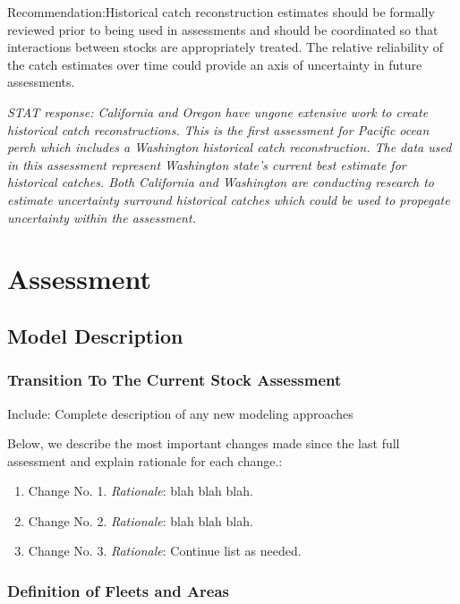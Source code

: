 \documentclass[12pt,]{article}
\begin{document}
Recommendation:Historical catch reconstruction estimates should be
formally reviewed prior to being used in assessments and should be
coordinated so that interactions between stocks are appropriately
treated. The relative reliability of the catch estimates over time could
provide an axis of uncertainty in future assessments.

\emph{STAT response: California and Oregon have ungone extensive work to
create historical catch reconstructions. This is the first assessment
for Pacific ocean perch which includes a Washington historical catch
reconstruction. The data used in this assessment represent Washington
state's current best estimate for historical catches. Both California
and Washington are conducting research to estimate uncertainty surround
historical catches which could be used to propegate uncertainty within
the assessment.}

\section{Assessment}\label{assessment}

\subsection{Model Description}\label{model-description}

\subsubsection{Transition To The Current Stock
Assessment}\label{transition-to-the-current-stock-assessment}

Include: Complete description of any new modeling approaches

Below, we describe the most important changes made since the last full
assessment and explain rationale for each change.:

\begin{enumerate}
\def\labelenumi{\arabic{enumi}.}
\item
  Change No. 1. \emph{Rationale}: blah blah blah.
\item
  Change No. 2. \emph{Rationale}: blah blah blah.
\item
  Change No. 3. \emph{Rationale}: Continue list as needed.
\end{enumerate}

\subsubsection{Definition of Fleets and
Areas}\label{definition-of-fleets-and-areas}
\end{document}
